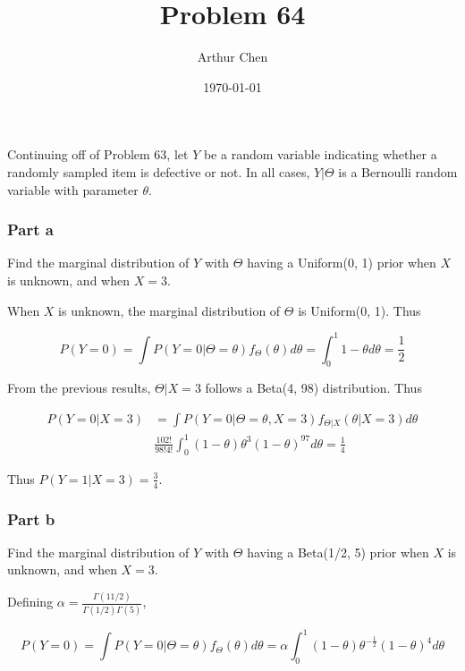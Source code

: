 \documentclass{article}
\author{Arthur Chen}
\title{Problem 64}
\date{\today}
\begin{document}
Continuing off of Problem 63, let $Y$ be a random variable indicating whether a randomly sampled item is defective or not. In all cases, $Y|\Theta$ is a Bernoulli random variable with parameter $\theta$.

\subsubsection*{Part a}

Find the marginal distribution of $Y$ with $\Theta$ having a Uniform(0, 1) prior when $X$ is unknown, and when $X=3$.

When $X$ is unknown, the marginal distribution of $\Theta$ is Uniform(0, 1). Thus

\[
P(Y=0) = \int P(Y=0|\Theta=\theta)f_{\Theta}(\theta)d\theta = \int_0^1 1-\theta d\theta = \frac{1}{2}
\]

From the previous results, $\Theta|X=3$ follows a Beta(4, 98) distribution. Thus

\begin{align*}
P(Y=0|X=3) &= \int P(Y=0|\Theta = \theta, X=3) f_{\Theta|X}(\theta|X=3) d\theta \\
& \frac{102!}{98!4!} \int_0^1 (1-\theta) \theta^3(1-\theta)^{97} d\theta = \frac{1}{4}
\end{align*}

Thus $P(Y=1|X=3) = \frac{3}{4}$.

\subsubsection*{Part b}

Find the marginal distribution of $Y$ with $\Theta$ having a Beta(1/2, 5) prior when $X$ is unknown, and when $X=3$.

Defining $\alpha = \frac{\Gamma(11/2)}{\Gamma(1/2)\Gamma(5)}$,

\[
P(Y=0) = \int P(Y=0|\Theta=\theta)f_{\Theta}(\theta)d\theta = \alpha \int_0^1 (1-\theta)\theta^{-\frac{1}{2}} (1-\theta)^4  d\theta
\]
\end{document}
